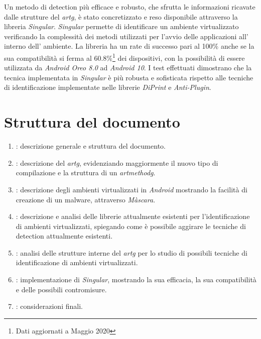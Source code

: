 Un metodo di detection più efficace e robusto, che sfrutta le informazioni ricavate dalle strutture del \emph{\gls{artg}}\glsfirstoccur, è stato concretizzato e reso disponibile attraverso la libreria \emph{Singular}. 
\emph{Singular} permette di identificare un ambiente virtualizzato verificando la complessità dei metodi utilizzati per l'avvio delle applicazioni all' interno dell' ambiente. La libreria ha un rate di successo pari al 100\% anche se la sua compatibilità si ferma al 60.8\%\footnote{Dati aggiornati a Maggio 2020} dei dispositivi, con la possibilità di essere utilizzata da \emph{Android Oreo 8.0} ad \emph{Android 10}.
I test effettuati dimostrano che la tecnica implementata in \emph{Singular} è più robusta e sofisticata rispetto alle tecniche di identificazione implementate nelle librerie \emph{DiPrint} e \emph{Anti-Plugin}.

\newpage
\section{Struttura del documento}

\begin{enumerate}

\item {}: descrizione generale e struttura del documento.
\item {}: descrizione del \emph{\gls{artg}}, evidenziando maggiormente il nuovo tipo di compilazione e la struttura di un \emph{\gls{artmethodg}}.
\item {}: descrizione degli ambienti virtualizzati in \emph{Android} mostrando la facilità di creazione di un malware, attraverso \emph{Màscara}.

\item {}: descrizione e analisi delle librerie attualmente esistenti per l'identificazione di ambienti virtualizzati, spiegando come è possibile aggirare le tecniche di detection attualmente esistenti.
\item {}: analisi delle strutture interne del \emph{\gls{artg}} per lo studio di possibili tecniche di identificazione di ambienti virtualizzati.
\item {}: implementazione di \emph{Singular}, mostrando la sua efficacia, la sua compatibilità e delle possibili contromisure.
\item {}: considerazioni finali.
\end{enumerate}